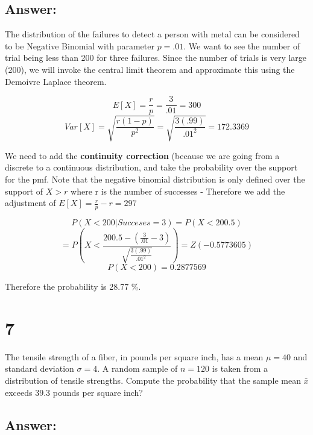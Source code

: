 \documentclass[svgnames]{article}
\begin{document}
\subsection*{Answer:}
The distribution of the failures to detect a person with metal can be considered to be Negative Binomial with parameter $p=.01$. We want to see the number of trial being less than 200 for three failures. 
\newline
Since the number of trials is very large (200), we will invoke the central limit theorem and approximate this using the Demoivre Laplace theorem.


$$E[X] =\frac{r}{p}=\frac{3}{.01} = 300$$ 
$$Var[X] = \sqrt{\frac{r(1-p)}{p^2}}=\sqrt{\frac{3(.99)}{.01^2}}=172.3369$$

We need to add the \textbf{continuity correction} (because we are going from a discrete to a continuous distribution, and take the probability over the support for the pmf. Note that the negative binomial distribution is only defined over the support of $X>r$ where r is the number of successes - Therefore we add the adjustment of $E[X] =\frac{r}{p} - r = 297$

$$P(X<200 | Succeses = 3) = P(X <200.5)$$
$$=P(X< \frac{200.5- (\frac{3}{.01} -3) }{\sqrt{\frac{3(.99)}{.01^2}}})= Z(-0.5773605)$$
$$P(X<200)=0.2877569$$

Therefore the probability is 28.77 \%.

\section*{7}
The tensile strength of a fiber, in pounds per square inch, has a mean $\mu = 40$ and standard deviation $\sigma = 4$. A random sample of $n= 120$ is taken from a distribution of tensile strengths. Compute the probability that the sample mean $\bar{x}$ exceeds 39.3 pounds per square inch?

\subsection*{Answer:}
\end{document}
